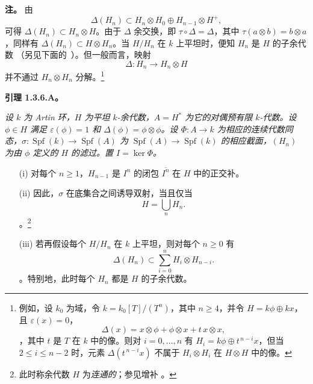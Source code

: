 \medskip\noindent\textbf{注。} \label{sga3:VIIB:1.3.6.remark} 由 \[
  \Delta(H_n)
  \subset
  H_n\otimes H_0\oplus H_{n-1}\otimes H^+,
\] 可得 \(\Delta(H_n)\subset H_n\otimes H\)。由于 \(\Delta\) 余交换，即 \(\tau\circ\Delta=\Delta\)，其中 \(\tau(a\otimes b)=b\otimes a\)，同样有 \(\Delta(H_n)\subset H\otimes H_n\)。当 \(H/H_n\) 在 \(k\) 上平坦时，便知 \(H_n\) 是 \(H\) 的子余代数 \textup{（另见下面的 \,\textup{}）}。但一般而言，映射 \[
  \Delta:H_n\longrightarrow H_n\otimes H
\] 并不通过 \(H_n\otimes H_n\) 分解。\footnote{\label{sga3:VIIB:nde:63}例如，设 \(k_0\) 为域，令 \(k=k_0[T]/(T^n)\)，其中 \(n\geq4\)，并令 \(H=k\phi\oplus kx\)，且 \(\varepsilon(x)=0\)，\[
  \Delta(x)
  =
  x\otimes\phi+\phi\otimes x+t\,x\otimes x,
\]，其中 \(t\) 是 \(T\) 在 \(k\) 中的像。则对 \(i=0,\ldots,n\) 有 \(H_i=k\phi\oplus t^{\,n-i}x\)，但当 \(2\leq i\leq n-2\) 时，元素 \(\Delta(t^{\,n-i}x)\) 不属于 \(H_i\otimes H_i\) 在 \(H\otimes H\) 中的像。}

\medskip\noindent\textbf{引理 1.3.6.A。} \label{sga3:VIIB:1.3.6.A} {\itshape 设 \(k\) 为 Artin 环，\(H\) 为平坦 \(k\)-余代数，\(A=H^*\) 为它的对偶预有限 \(k\)-代数。设 \(\phi\in H\) 满足 \(\varepsilon(\phi)=1\) 和 \(\Delta(\phi)=\phi\otimes\phi\)。设 \(\Phi:A\to k\) 为相应的连续代数同态，\(\sigma:\operatorname{Spf}(k)\to\operatorname{Spf}(A)\) 为 \(\operatorname{Spf}(A)\to\operatorname{Spf}(k)\) 的相应截面，\((H_n)\) 为由 \(\phi\) 定义的 \(H\) 的滤过。置 \(I=\ker\Phi\)。\begin{enumerate}\item[\textup{(i)}]对每个 \(n\geq1\)，\(H_{n-1}\) 是 \(I^n\) 的闭包 \(\overline{I^n}\) 在 \(H\) 中的正交补。

\item[\textup{(ii)}]因此，\(\sigma\) 在底集合之间诱导双射，当且仅当 \[
    H=\bigcup_n H_n.
  \]。\footnote{\label{sga3:VIIB:nde:64}此时称余代数 \(H\) 为\emph{连通的}；参见增补 。}

\item[\textup{\SGAInlineRefTarget{sga3:VIIB:1.3.6.A:item:iii}(iii)}]若再假设每个 \(H/H_n\) 在 \(k\) 上平坦，则对每个 \(n\geq0\) 有 \begin{equation}
    \Delta(H_n)
    \subset
    \sum_{i=0}^n H_i\otimes H_{n-i}.
    \tag{*}
    \label{sga3:VIIB:1.3.6.A:star}
  \end{equation}。特别地，此时每个 \(H_n\) 都是 \(H\) 的子余代数。\end{enumerate}}

